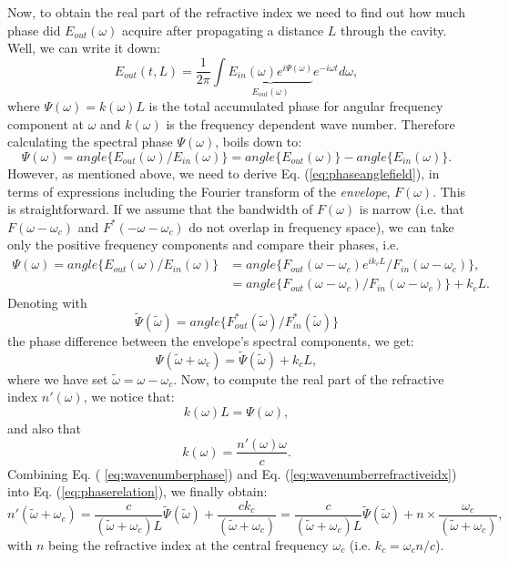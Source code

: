 \documentclass[10pt,letterpaper]{article}
\begin{document}
{Now, to obtain the real part of the refractive index we need to find out how much phase did $E_{out}(\omega)$ acquire after propagating a distance $L$ through the cavity. Well, we can write it down:
\begin{equation}
E_{out}(t,L)  = \frac{1}{2\pi} \int \underbrace{E_{in}(\omega) e^{i\Psi(\omega)}}_{E_{out}(\omega)}e^{-i\omega t}  d\omega,
\end{equation}
where $\Psi(\omega) = k(\omega)L$ is the total accumulated phase for angular frequency component at $\omega$ and $k(\omega)$ is the frequency dependent wave number. Therefore calculating the spectral phase $\Psi(\omega)$, boils down to:
\begin{equation}
\label{eq:phaseanglefield}
\Psi(\omega) = angle\{E_{out}(\omega)/E_{in}(\omega)\} = angle\{E_{out}(\omega) \} - angle\{E_{in}(\omega)\}.
\end{equation}
However, as mentioned above, we need to derive Eq. (\ref{eq:phaseanglefield}), in terms of expressions including the Fourier transform of the \emph{envelope}, $F(\omega)$. This is straightforward. If we assume that the bandwidth of $F(\omega)$ is narrow (i.e. that $F(\omega-\omega_c)$ and $ F^*(-\omega-\omega_c)$ do not overlap in frequency space), we can take only the positive frequency components and compare their phases, i.e. 
\begin{align}
\Psi(\omega) = angle\{E_{out}(\omega)/E_{in}(\omega)\} &= angle\{F_{out}(\omega-\omega_c)e^{ik_cL}/F_{in}(\omega-\omega_c)\}, \nonumber \\
& = angle\{F_{out}(\omega-\omega_c)/F_{in}(\omega-\omega_c)\} + k_cL. 
\end{align}
Denoting with 
\begin{equation}
\tilde{\Psi}(\tilde{\omega}) = angle\{F^*_{out}(\tilde{\omega})/F^*_{in}(\tilde{\omega})\}
\end{equation}
the phase difference between the envelope's spectral components, we get:
\begin{equation}
\label{eq:phaserelation}
\Psi(\tilde{\omega}+\omega_c) = \tilde{\Psi}(\tilde{\omega}) + k_cL,
\end{equation}
where we have set $\tilde{\omega} = \omega - \omega_c$. Now, to compute the real part of the refractive index $n'(\omega)$, we notice that:
\begin{equation}
\label{eq:wavenumberphase}
k(\omega)L = \Psi(\omega),
\end{equation}
and also that
\begin{equation}
\label{eq:wavenumberrefractiveidx}
k(\omega) =  \frac{n'(\omega)\omega}{c}.
\end{equation}
Combining Eq. ( \ref{eq:wavenumberphase}) and Eq. (\ref{eq:wavenumberrefractiveidx}) into Eq. (\ref{eq:phaserelation}), we finally obtain:
\begin{equation}
n'(\tilde{\omega}+\omega_c) = \frac{c}{(\tilde{\omega}+\omega_c)L}\tilde{\Psi}(\tilde{\omega})+\frac{ck_c}{(\tilde{\omega}+\omega_c)} = \frac{c}{(\tilde{\omega}+\omega_c)L}\tilde{\Psi}(\tilde{\omega}) +n\times\frac{ \omega_c}{(\tilde{\omega}+\omega_c)},
\end{equation}
with $n$ being the refractive index at the central frequency $\omega_c$ (i.e. $k_c = \omega_c n/c$). 

}
\end{document}
